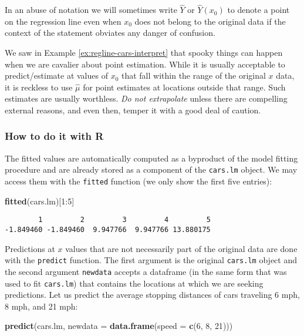 \documentclass[]{book}
\newenvironment{Shaded}{\begin{snugshade}}{\end{snugshade}}
\newcommand{\KeywordTok}[1]{\textcolor[rgb]{0.13,0.29,0.53}{\textbf{{#1}}}}
\newcommand{\DataTypeTok}[1]{\textcolor[rgb]{0.13,0.29,0.53}{{#1}}}
\newcommand{\DecValTok}[1]{\textcolor[rgb]{0.00,0.00,0.81}{{#1}}}
\newcommand{\NormalTok}[1]{{#1}}
\numberwithin{equation}{chapter}
\numberwithin{figure}{chapter}
\theoremstyle{plain}
\theoremstyle{definition}
\theoremstyle{remark}
\theoremstyle{definition}
\theoremstyle{definition}
\theoremstyle{remark}
\begin{document}
In an abuse of notation we will sometimes write \(\hat{Y}\) or
\(\hat{Y}(x_{0})\) to denote a point on the regression line even when
\(x_{0}\) does not belong to the original data if the context of the
statement obviates any danger of confusion.

We saw in Example \ref{ex:regline-cars-interpret} that spooky things can
happen when we are cavalier about point estimation. While it is usually
acceptable to predict/estimate at values of \(x_{0}\) that fall within
the range of the original \(x\) data, it is reckless to use
\(\hat{\mu}\) for point estimates at locations outside that range. Such
estimates are usually worthless. \emph{Do not extrapolate} unless there
are compelling external reasons, and even then, temper it with a good
deal of caution.

\subsubsection{How to do it with R}\label{how-to-do-it-with-r-40}

The fitted values are automatically computed as a byproduct of the model
fitting procedure and are already stored as a component of the
\texttt{cars.lm} object. We may access them with the \texttt{fitted}
function (we only show the first five entries):

\begin{Shaded}
\begin{Highlighting}[]
\KeywordTok{fitted}\NormalTok{(cars.lm)[}\DecValTok{1}\NormalTok{:}\DecValTok{5}\NormalTok{]}
\end{Highlighting}
\end{Shaded}

\begin{verbatim}
        1         2         3         4         5 
-1.849460 -1.849460  9.947766  9.947766 13.880175 
\end{verbatim}

Predictions at \(x\) values that are not necessarily part of the
original data are done with the \texttt{predict} function. The first
argument is the original \texttt{cars.lm} object and the second argument
\texttt{newdata} accepts a dataframe (in the same form that was used to
fit \texttt{cars.lm}) that contains the locations at which we are
seeking predictions. Let us predict the average stopping distances of
cars traveling 6 mph, 8 mph, and 21 mph:

\begin{Shaded}
\begin{Highlighting}[]
\KeywordTok{predict}\NormalTok{(cars.lm, }\DataTypeTok{newdata =} \KeywordTok{data.frame}\NormalTok{(}\DataTypeTok{speed =} \KeywordTok{c}\NormalTok{(}\DecValTok{6}\NormalTok{, }\DecValTok{8}\NormalTok{, }\DecValTok{21}\NormalTok{)))}
\end{Highlighting}
\end{Shaded}
\end{document}

